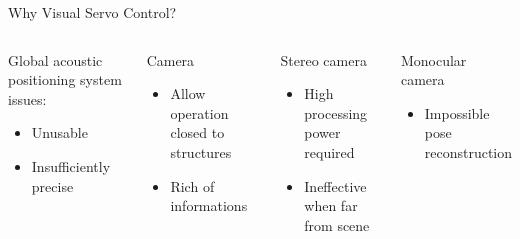 \documentclass{beamer}
\begin{document}
\begin{frame}{Why Visual Servo Control?}




	\begin{columns}[t]
		\begin{block}{Global acoustic positioning system issues:}		
			\begin{itemize}
				\item Unusable
				\item Insufficiently precise 
			\end{itemize}
		\end{block}
		\begin{block}{Camera}		
			\begin{itemize}
				\item Allow operation closed to structures
				\item Rich of informations
			\end{itemize}
		\end{block}
	
		
		\begin{block}{Stereo camera}
			\begin{itemize}
				\item High processing power required
				\item Ineffective when far from scene
			\end{itemize}
		\end{block}
		\begin{block}{Monocular camera}
			\begin{itemize}
				\item Impossible pose reconstruction   
			\end{itemize}
		\end{block}
	\end{columns}

\end{frame}
\end{document}
